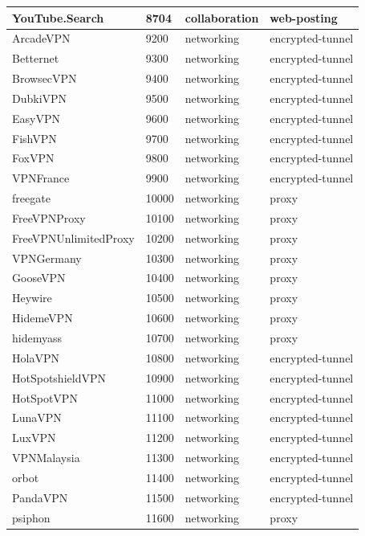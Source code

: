 \begin{longtable}{p{}|p{}|p{}|p{}}
    YouTube.Search &	8704 &	collaboration &	web-posting \\ \hline
    ArcadeVPN &	9200 &	networking &	encrypted-tunnel \\ \hline
    Betternet &	9300 &	networking &	encrypted-tunnel \\ \hline
    BrowsecVPN &	9400 &	networking &	encrypted-tunnel \\ \hline
    DubkiVPN &	9500 &	networking &	encrypted-tunnel \\ \hline
    EasyVPN &	9600 &	networking &	encrypted-tunnel \\ \hline
    FishVPN &	9700 &	networking &	encrypted-tunnel \\ \hline
    FoxVPN &	9800 &	networking &	encrypted-tunnel \\ \hline
    VPNFrance &	9900 &	networking &	encrypted-tunnel \\ \hline
    freegate &	10000 &	networking &	proxy \\ \hline
    FreeVPNProxy &	10100 &	networking &	proxy \\ \hline
    FreeVPNUnlimitedProxy &	10200 &	networking &	proxy \\ \hline
    VPNGermany &	10300 &	networking &	proxy \\ \hline
    GooseVPN &	10400 &	networking &	proxy \\ \hline
    Heywire &	10500 &	networking &	proxy \\ \hline
    HidemeVPN &	10600 &	networking &	proxy \\ \hline
    hidemyass &	10700 &	networking &	proxy \\ \hline
    HolaVPN &	10800 &	networking &	encrypted-tunnel \\ \hline
    HotSpotshieldVPN &	10900 &	networking &	encrypted-tunnel \\ \hline
    HotSpotVPN &	11000 &	networking &	encrypted-tunnel \\ \hline
    LunaVPN &	11100 &	networking &	encrypted-tunnel \\ \hline
    LuxVPN &	11200 &	networking &	encrypted-tunnel \\ \hline
    VPNMalaysia &	11300 &	networking &	encrypted-tunnel \\ \hline
    orbot &	11400 &	networking &	encrypted-tunnel \\ \hline
    PandaVPN &	11500 &	networking &	encrypted-tunnel \\ \hline
    psiphon &	11600 &	networking &	proxy \\ \hline

\end{longtable}
